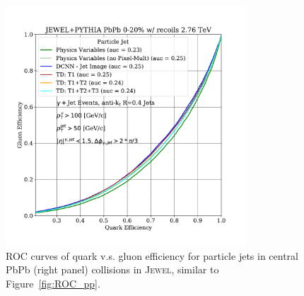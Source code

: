 \documentclass[notoc,preprintnumbers]{JHEP3}
\begin{document}
\begin{figure}[h]
	\centering
	\includegraphics[width=0.8\textwidth]{plots/JEWELPYTHIA_PbPb_2p76TeV_genLevel_QvsG.pdf}
	\caption{ROC curves of quark v.s. gluon efficiency for particle jets in central PbPb (right panel) collisions in \textsc{Jewel}, similar to Figure~\ref{fig:ROC_pp}.}
\label{fig:ROC_pbpb}
\end{figure}
\end{document}

